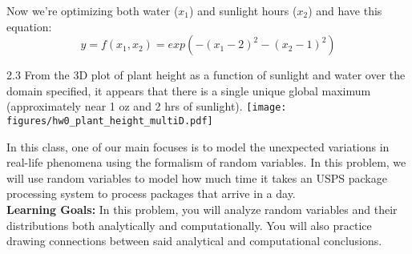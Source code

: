 \documentclass{harvardml}
\theoremstyle{definition}
\theoremstyle{plain}
\begin{document}
\medskip

Now we're optimizing both water ($x_1$) and sunlight hours ($x_2$) and have this equation: $$y = f(x_1, x_2) = exp(-(x_1-2)^2 - (x_2-1)^2)$$

\medskip

2.3 From the 3D plot of plant height as a function of sunlight and water over the domain specified, it appears that there is a single unique global maximum (approximately near 1 oz and 2 hrs of sunlight).
\texttt{[image: figures/hw0\_plant\_height\_multiD.pdf]}


\newpage

\begin{problem}
In this class, one of our main focuses is to model the unexpected variations in real-life phenomena using the formalism of random variables. In this problem, we will use random variables to model how much time it takes an USPS package processing system to process packages that arrive in a day.\\

\noindent \textbf{Learning Goals:} In this problem, you will analyze random variables and their distributions both analytically and computationally. You will also practice drawing connections between said analytical and computational conclusions.\\


\end{problem}
\end{document}
